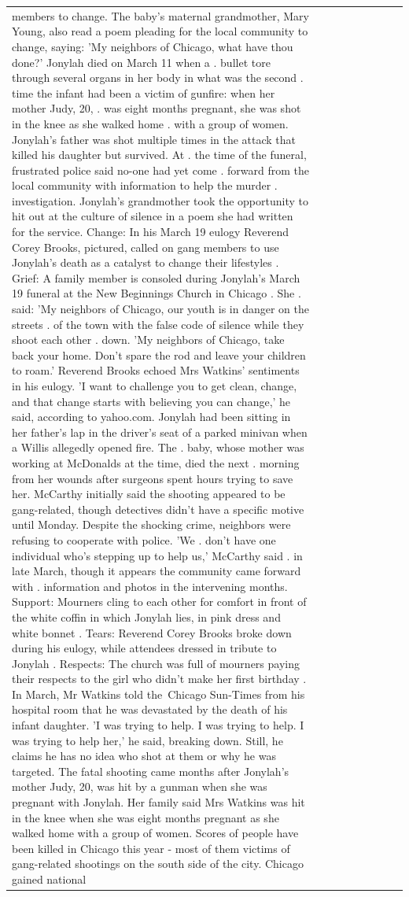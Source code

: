 \begin{table}[H]
\begin{tabular}{lllrlllll}
members to change. The baby's maternal grandmother, Mary Young, also read a poem pleading for the local community to change, saying: 'My neighbors of Chicago, what have thou done?' Jonylah died on March 11 when a . bullet tore through several organs in her body in what was the second . time the infant had been a victim of gunfire: when her mother Judy, 20, . was eight months pregnant, she was shot in the knee as she walked home . with a group of women. Jonylah's father was shot multiple times in the attack that killed his daughter but survived. At . the time of the funeral, frustrated police said no-one had yet come . forward from the local community with information to help the murder . investigation. Jonylah's grandmother took the opportunity to hit out at the culture of silence in a poem she had written for the service. Change: In his March 19 eulogy Reverend Corey Brooks, pictured, called on gang members to use Jonylah's death as a catalyst to change their lifestyles . Grief: A family member is consoled during Jonylah's March 19 funeral at the New Beginnings Church in Chicago . She . said: 'My neighbors of Chicago, our youth is in danger on the streets . of the town with the false code of silence while they shoot each other . down. 'My neighbors of Chicago, take back your home. Don't spare the rod and leave your children to roam.' Reverend Brooks echoed Mrs Watkins' sentiments in his eulogy. 'I want to challenge you to get clean, change, and that change starts with believing you can change,' he said, according to yahoo.com. Jonylah had been sitting in her father's lap in the driver's seat of a parked minivan when a Willis allegedly opened fire. The . baby, whose mother was working at McDonalds at the time, died the next . morning from her wounds after surgeons spent hours trying to save her. McCarthy initially said the shooting appeared to be gang-related, though detectives didn't have a specific motive until Monday. Despite the shocking crime, neighbors were refusing to cooperate with police. 'We . don't have one individual who's stepping up to help us,' McCarthy said . in late March, though it appears the community came forward with . information and photos in the intervening months. Support: Mourners cling to each other for comfort in front of the white coffin in which Jonylah lies, in pink dress and white bonnet . Tears: Reverend Corey Brooks broke down during his eulogy, while attendees dressed in tribute to Jonylah . Respects: The church was full of mourners paying their respects to the girl who didn't make her first birthday . In March, Mr Watkins told the Chicago Sun-Times from his hospital room that he was devastated by the death of his infant daughter. 'I was trying to help. I was trying to help. I was trying to help her,' he said, breaking down. Still, he claims he has no idea who shot at them or why he was targeted. The fatal shooting came months after Jonylah's mother Judy, 20, was hit by a gunman when she was pregnant with Jonylah. Her family said Mrs Watkins was hit in the knee when she was eight months pregnant as she walked home with a group of women. Scores of people have been killed in Chicago this year - most of them victims of gang-related shootings on the south side of the city. Chicago gained national 
\end{tabular}
\end{table}
